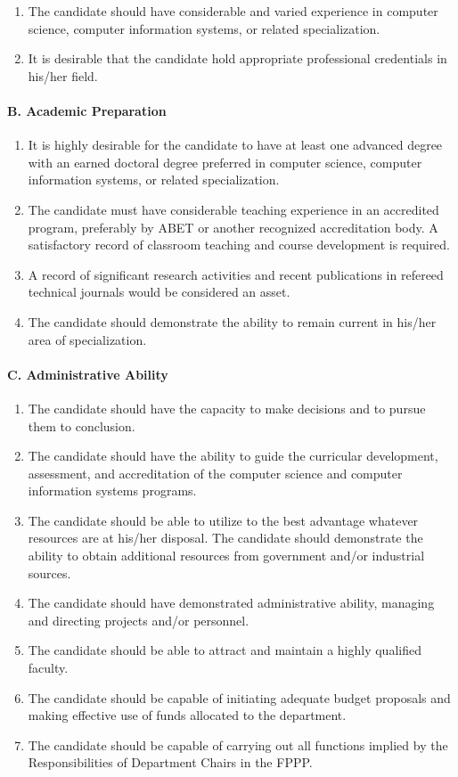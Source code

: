\documentclass{scrartcl}
\begin{document}
\begin{enumerate}
\item The candidate should have considerable and varied experience in computer science, computer information systems, or related specialization.
\item It is desirable that the candidate hold appropriate professional credentials in his/her field.
\end{enumerate}
\paragraph{B. Academic Preparation}

\begin{enumerate}
\item It is highly desirable for the candidate to have at least one advanced degree with an earned doctoral degree preferred in computer science, computer information systems, or related specialization.
\item The candidate must have considerable teaching experience in an accredited program, preferably by ABET or another recognized accreditation body. A satisfactory record of classroom teaching and course development is required.
\item A record of significant research activities and recent publications in refereed technical journals would be considered an asset.
\item The candidate should demonstrate the ability to remain current in his/her area of specialization.

\end{enumerate}
\paragraph{C. Administrative Ability}

\begin{enumerate}
\item The candidate should have the capacity to make decisions and to pursue them to conclusion.
\item The candidate should have the ability to guide the curricular development, assessment, and accreditation of the computer science and computer information systems programs.
\item The candidate should be able to utilize to the best advantage whatever resources are at his/her disposal. The candidate should demonstrate the ability to obtain additional resources from government and/or industrial sources.
\item The candidate should have demonstrated administrative ability, managing and directing projects and/or personnel.
\item The candidate should be able to attract and maintain a highly qualified faculty.
\item The candidate should be capable of initiating adequate budget proposals and making effective use of funds allocated to the department.
\item The candidate should be capable of carrying out all functions implied by the Responsibilities of Department Chairs in the FPPP.

\end{enumerate}
\end{document}
